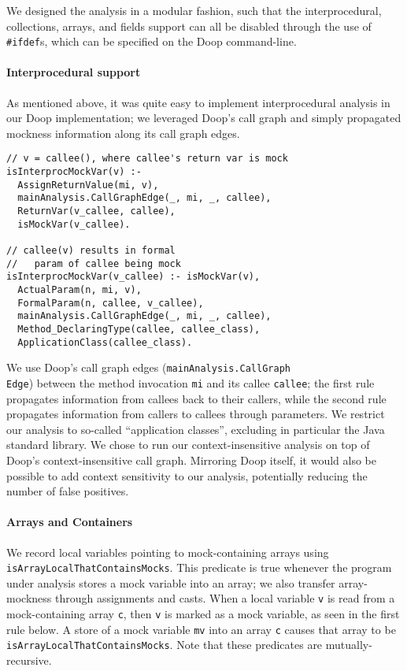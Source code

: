We designed the analysis in a modular fashion, such that the interprocedural, collections, arrays, and fields support can all be disabled through the use of \verb+#ifdef+s, which can be specified on the Doop command-line.

\paragraph{Interprocedural support}
As mentioned above, it was quite easy to implement interprocedural analysis in our Doop implementation; we leveraged Doop's call graph and simply propagated mockness information along its call graph edges.

\begin{lstlisting}[basicstyle=\ttfamily\small,numbers=none,caption={Two rules give interprocedural analysis in Doop.}]
// v = callee(), where callee's return var is mock
isInterprocMockVar(v) :-
  AssignReturnValue(mi, v),
  mainAnalysis.CallGraphEdge(_, mi, _, callee),
  ReturnVar(v_callee, callee),
  isMockVar(v_callee).

// callee(v) results in formal
//   param of callee being mock
isInterprocMockVar(v_callee) :- isMockVar(v),
  ActualParam(n, mi, v),
  FormalParam(n, callee, v_callee),
  mainAnalysis.CallGraphEdge(_, mi, _, callee),
  Method_DeclaringType(callee, callee_class),
  ApplicationClass(callee_class).
\end{lstlisting}
We use Doop's call graph edges (\texttt{mainAnalysis.CallGraph\\Edge}) between the method invocation {\tt mi} and its callee {\tt callee}; the first rule propagates information from callees back to their callers, while the second rule propagates information from callers to callees through parameters. We restrict our analysis to so-called ``application classes'', excluding in particular the Java standard library. We chose to run our context-insensitive analysis on top of Doop's context-insensitive call graph. Mirroring Doop itself, it would also be possible to add context sensitivity to our analysis, potentially reducing the number of false positives.%

\paragraph{Arrays and Containers} We record local variables pointing to mock-containing arrays using  {\tt isArrayLocalThatContainsMocks}. This predicate is true whenever the program under analysis stores a mock variable into an array; we also transfer array-mockness through assignments and casts. When a local variable \texttt{v} is read from a mock-containing array \texttt{c}, then \texttt{v} is marked as a mock variable, as seen in the first rule below. A store of a mock variable \texttt{mv} into an array \texttt{c} causes that array to be \texttt{isArrayLocalThatContainsMocks}. Note that these predicates are mutually-recursive. 

